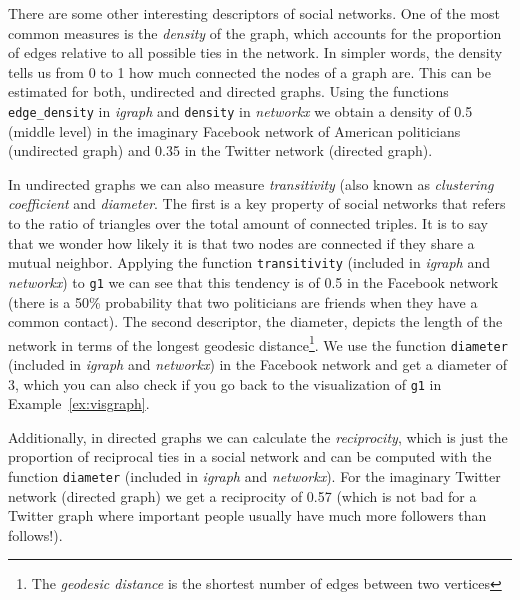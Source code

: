 
There are some other interesting descriptors of social networks. One of the most common measures is the \emph{density} of the graph, which accounts for the proportion of edges relative to all possible ties in the network. In simpler words, the density tells us from 0 to 1 how much connected the nodes of a graph are. This can be estimated for both, undirected and directed graphs. Using the functions \texttt{edge\_density} in \emph{igraph} and \texttt{density} in \emph{networkx} we obtain a density of 0.5 (middle level) in the imaginary Facebook network of American politicians (undirected graph) and 0.35 in the Twitter network (directed graph).

In undirected graphs we can also measure \emph{transitivity} (also known as \emph{clustering coefficient} and \emph{diameter}. The first is a key property of social networks that refers to the ratio of triangles over the total amount of connected triples. It is to say that we wonder how likely it is that two nodes are connected if they share a mutual neighbor. Applying the function \texttt{transitivity} (included in \emph{igraph} and \emph{networkx}) to \texttt{g1} we can see that this tendency is of 0.5 in the Facebook network (there is a 50\% probability that two politicians
are friends when they have a common contact). The second descriptor, the diameter, depicts the length of the network in terms of the longest geodesic distance\footnote{The \emph{geodesic distance} is the shortest number of edges between two vertices}. We use the function \texttt{diameter} (included in \emph{igraph} and \emph{networkx}) in the Facebook network and get a diameter of 3, which you can also check if you go back to the visualization of \texttt{g1} in Example~\ref{ex:visgraph}.

Additionally, in directed graphs we can calculate the \emph{reciprocity}, which is just the proportion of reciprocal ties in a social network and can be computed with the function \texttt{diameter} (included in \emph{igraph} and \emph{networkx}). For the imaginary Twitter network (directed graph) we get a reciprocity of 0.57 (which is not bad for a Twitter graph where important people usually have much more followers than follows!).

